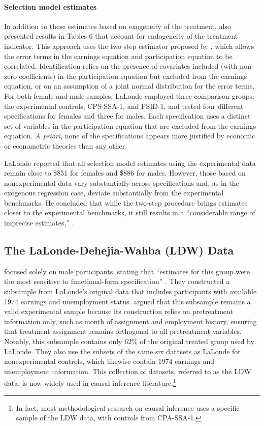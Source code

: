 \documentclass[letterpaper,12pt,leqno]{article}
\begin{document}
\paragraph{Selection model estimates} In addition to these estimates based on exogeneity of the treatment,  \citet{LaLonde} also presented results in Tables 6 that account for endogeneity of the treatment indicator. This approach uses the two-step estimator proposed by \citet{heckman1978}, which allows the error terms in the earnings equation and participation equation to be correlated. Identification relies on the presence of covariates included (with non-zero coefficients) in the participation equation but excluded from the earnings equation, or on an assumption of a joint normal distribution for the error terms. For both female and male samples, LaLonde employed three comparison groups: the experimental controls, CPS-SSA-1, and PSID-1, and tested four different specifications for females and three for males. Each specification uses a distinct set of variables in the participation equation that are excluded from the earnings equation. {\it A priori}, none of the  specifications appears more justified by economic or econometric theories than any other. 

LaLonde reported that all selection model estimates using the experimental data remain close to \$851 for females and \$886 for males. However, those based on nonexperimental data vary substantially across specifications and, as in the exogenous regression case, deviate substantially from the experimental benchmarks. He concluded that while the two-step procedure brings estimates closer to the experimental benchmarks, it still results in a ``considerable range of imprecise estimates,'' \cite[p. 617]{LaLonde}.

\subsection{The LaLonde-Dehejia-Wahba (LDW) Data}

\citet{dehejiawahba} focused solely on male participants, stating that ``estimates for this group were the most sensitive to functional-form specification'' \cite[p. 1054]{dehejiawahba}. They constructed a subsample from LaLonde's original data that includes participants with available 1974 earnings and unemployment status. \citet{dehejiawahba} argued that this subsample remains a valid experimental sample because its construction relies on pretreatment information only, such as month of assignment and employment history, ensuring that treatment assignment remains orthogonal to all pretreatment variables. Notably, this subsample contains only 62\% of the original treated group used by LaLonde. They also use the subsets of the same six datasets as LaLonde for nonexperimental controls, which likewise contain 1974 earnings and unemployment information. This collection of datasets, referred to as the LDW data, is now widely used in causal inference literature.\footnote{In fact, most methodological research on causal inference uses a specific sample of the LDW data, with controls from CPA-SSA-1.} 
\end{document}
